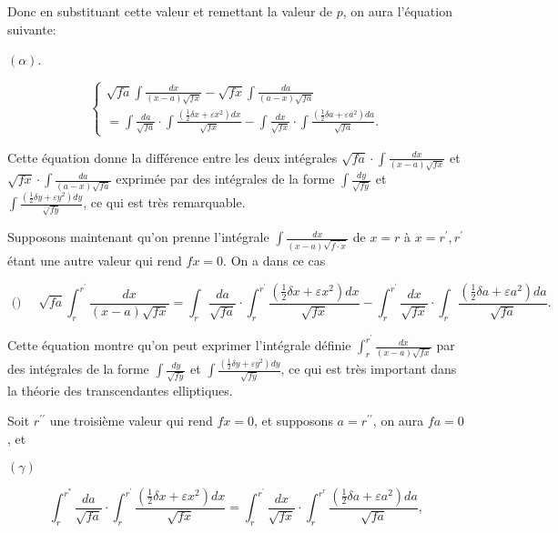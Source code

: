 \documentclass{article}
\begin{document}
Donc en substituant cette valeur et remettant la valeur de \(p\), on aura l'équation suivante:

\((\alpha)\).

\[
\left\{\begin{array}{c}
\sqrt{f a} \int \frac{d x}{(x-a) \sqrt{f x}}-\sqrt{f x} \int \frac{d a}{(a-x) \sqrt{f a}} \\
=\int \frac{d a}{\sqrt{f a}} \cdot \int \frac{\left(\frac{1}{2} \delta x+\varepsilon x^{2}\right) d x}{\sqrt{f x}}-\int \frac{d x}{\sqrt{f x}} \cdot \int \frac{\left(\frac{1}{2} \delta a+\varepsilon a^{2}\right) d a}{\sqrt{f a}} .
\end{array}\right.
\]

Cette équation donne la différence entre les deux intégrales \(\sqrt{f a} \cdot \int \frac{d x}{(x-a) \sqrt{f x}}\) et \(\sqrt{f x} \cdot \int \frac{d a}{(a-x) \sqrt{f a}}\) exprimée par des intégrales de la forme \(\int \frac{d y}{\sqrt{f y}}\) et \(\int \frac{\left(\frac{1}{2} \delta y+\varepsilon y^{2}\right) d y}{\sqrt{f y}}\), ce qui est très remarquable.

Supposons maintenant qu'on prenne l'intégrale \(\int \frac{d x}{(x-a) \sqrt{\overline{f \cdot x}}}\) de \(x=r\) à \(x=r^{\prime}, r^{\prime}\) étant une autre valeur qui rend \(f x=0\). On a dans ce cas

\[
\text { () } \quad \sqrt{f a} \int_{r}^{r^{\prime}} \frac{d x}{(x-a) \sqrt{f x}}=\int_{r} \frac{d a}{\sqrt{f a}} \cdot \int_{r}^{r^{\prime}} \frac{\left(\frac{1}{2} \delta x+\varepsilon x^{2}\right) d x}{\sqrt{f x}}-\int_{r}^{r^{\prime}} \frac{d x}{\sqrt{f x}} \cdot \int_{r} \frac{\left(\frac{1}{2} \delta a+\varepsilon a^{2}\right) d a}{\sqrt{f a}} \text {. }
\]

Cette équation montre qu'on peut exprimer l'intégrale définie \(\int_{r}^{r^{\prime}} \frac{d x}{(x-a) \sqrt{f x}}\) par des intégrales de la forme \(\int \frac{d y}{\sqrt{f y}}\) et \(\int \frac{\left(\frac{1}{2} \delta y+\varepsilon y^{2}\right) d y}{\sqrt{f y}}\), ce qui est très important dans la théorie des transcendantes elliptiques.

Soit \(r^{\prime \prime}\) une troisième valeur qui rend \(f x=0\), et supposons \(a=r^{\prime \prime}\), on aura \(f a=0\), et

\((\gamma)\)

\[
\int_{r}^{r^{*}} \frac{d a}{\sqrt{f a}} \cdot \int_{r}^{r^{\prime}} \frac{\left(\frac{1}{2} \delta x+\varepsilon x^{2}\right) d x}{\sqrt{f x}}=\int_{r}^{r^{\prime}} \frac{d x}{\sqrt{f x}} \cdot \int_{r}^{r^{r}} \frac{\left(\frac{1}{2} \delta a+\varepsilon a^{2}\right) d a}{\sqrt{f a}},
\]
\end{document}
